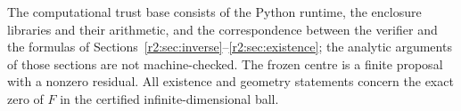 The computational trust base consists of the Python runtime, the enclosure libraries and their arithmetic, and the correspondence between the verifier and the formulas of Sections~\ref{r2:sec:inverse}--\ref{r2:sec:existence}; the analytic arguments of those sections are not machine-checked. The frozen centre is a finite proposal with a nonzero residual. All existence and geometry statements concern the exact zero of $F$ in the certified infinite-dimensional ball.
